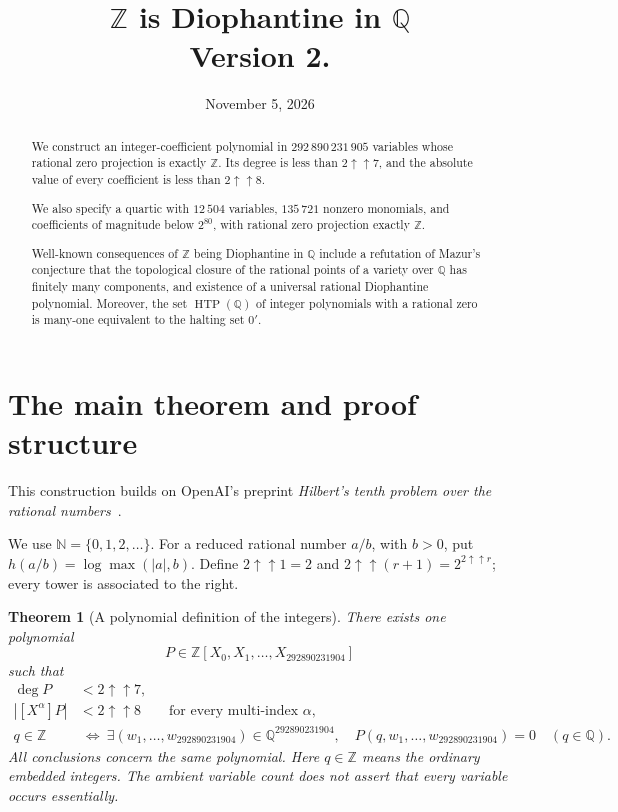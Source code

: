 \documentclass[11pt]{article}
\title{$\mathbb{Z}$ is Diophantine in $\mathbb{Q}$\\[4pt]\large Version 2.}
\author{}
\date{November 5, 2026}
\newtheorem{theorem}{Theorem}[section]
\theoremstyle{definition}
\theoremstyle{remark}
\newcommand{\Q}{\mathbb Q}
\newcommand{\Z}{\mathbb Z}
\newcommand{\N}{\mathbb N}
\newcommand{\tw}[1]{2\mathbin{\uparrow\!\uparrow}#1}
\begin{document}
\maketitle
\begin{abstract}
We construct an integer-coefficient polynomial in
$292\,890\,231\,905$ variables whose rational zero projection is exactly
$\Z$. Its degree is less than $2\mathbin{\uparrow\!\uparrow}7$, and the
absolute value of every coefficient is less than
$2\mathbin{\uparrow\!\uparrow}8$.

We also specify a quartic with $12\,504$ variables, $135\,721$ nonzero monomials, and coefficients of magnitude below $2^{80}$,
with rational zero projection exactly $\Z$.

Well-known consequences of $\Z$ being Diophantine in $\Q$ include a refutation of Mazur's conjecture that the topological closure of the rational points of a variety over $\Q$ has finitely many components, and existence of a universal rational Diophantine polynomial. Moreover, the set $\operatorname{HTP}(\Q)$ of integer polynomials with a rational zero is many-one equivalent to the halting set $0'$.
\end{abstract}
\tableofcontents

\section{The main theorem and proof structure}\label{sec:main}
This construction builds on OpenAI's preprint
\emph{Hilbert's tenth problem over the rational numbers}~\cite{openaihtp}.

We use $\N=\{0,1,2,\ldots\}$. For a reduced rational number $a/b$, with
$b>0$, put $h(a/b)=\log\max(|a|,b)$. Define $\tw1=2$ and
$\tw{(r+1)}=2^{\tw r}$; every tower is associated to the right.

\begin{theorem}[A polynomial definition of the integers]\label{thm:target}
There exists one polynomial
\[
 P\in\Z[X_0,X_1,\ldots,X_{292890231904}]
\]
such that
\begin{align*}
 \deg P&<\tw7,\\
 |[X^\alpha]P|&<\tw8\qquad\text{for every multi-index }\alpha,\\
 q\in\Z&\ \Longleftrightarrow\
 \exists(w_1,\ldots,w_{292890231904})\in\Q^{292890231904},\quad
 P(q,w_1,\ldots,w_{292890231904})=0\quad(q\in\Q).
\end{align*}
All conclusions concern the same polynomial. Here $q\in\Z$ means the
ordinary embedded integers. The ambient variable count does not assert that
every variable occurs essentially.
\end{theorem}
\end{document}
